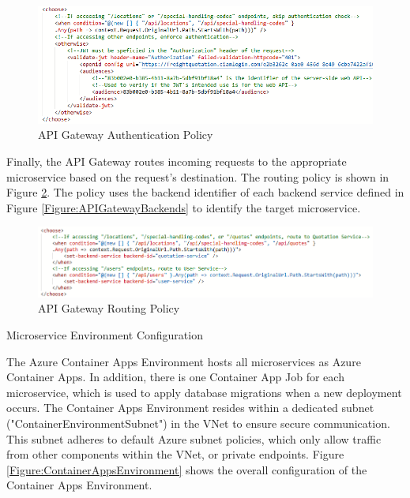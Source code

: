 \documentclass[12pt, reqno, oneside]{amsbook}
\makeatletter
\def\subsection{\@startsection{subsection}{2}%
      \z@{.5\linespacing\@plus.7\linespacing}{.25\linespacing}%
      {\normalfont\bfseries\flushleft}}
\theoremstyle{definition}
\theoremstyle{definition}
\numberwithin{section}{chapter}
\numberwithin{table}{chapter}
\numberwithin{figure}{chapter}
\makeatother
\begin{document}
\begin{figure}[H]
  \centering
  \includegraphics[width=0.9\linewidth]{images/APIGatewayConfigurationAuthentication.png}
  \caption{\label{Figure:APIGatewayConfigurationAuthentication}API Gateway Authentication Policy}
\end{figure}

Finally, the \ac{API} Gateway routes incoming requests to the appropriate microservice based on the request's destination. The routing policy is shown in Figure \ref{Figure:APIGatewayConfigurationRouting}. The policy uses the backend identifier of each backend service defined in Figure \ref{Figure:APIGatewayBackends} to identify the target microservice.

\begin{figure}[H]
  \centering
  \includegraphics[width=1\linewidth]{images/APIGatewayConfigurationRouting.png}
  \caption{\label{Figure:APIGatewayConfigurationRouting}API Gateway Routing Policy}
\end{figure}

\subsection{Microservice Environment Configuration}
\label{Subsection:Microservice_Environment_Configuration}

The Azure Container Apps Environment hosts all microservices as Azure Container Apps. In addition, there is one Container App Job for each microservice, which is used to apply database migrations when a new deployment occurs. The Container Apps Environment resides within a dedicated subnet ("ContainerEnvironmentSubnet") in the \ac{VNet} to ensure secure communication. This subnet adheres to default Azure subnet policies, which only allow traffic from other components within the \ac{VNet}, or private endpoints. Figure \ref{Figure:ContainerAppsEnvironment} shows the overall configuration of the Container Apps Environment.
\end{document}

